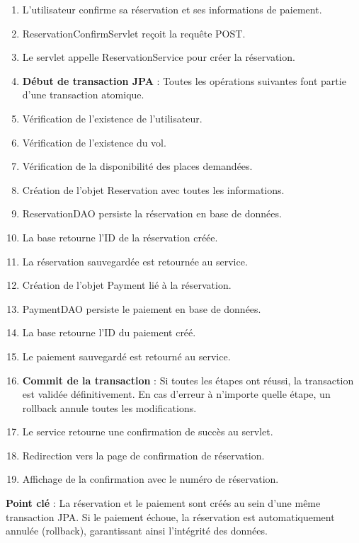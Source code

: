\documentclass[12pt,a4paper]{report}
\begin{document}
\begin{enumerate}
    \item L'utilisateur confirme sa réservation et ses informations de paiement.
    \item ReservationConfirmServlet reçoit la requête POST.
    \item Le servlet appelle ReservationService pour créer la réservation.
    \item \textbf{Début de transaction JPA} : Toutes les opérations suivantes font partie d'une transaction atomique.
    \item Vérification de l'existence de l'utilisateur.
    \item Vérification de l'existence du vol.
    \item Vérification de la disponibilité des places demandées.
    \item Création de l'objet Reservation avec toutes les informations.
    \item ReservationDAO persiste la réservation en base de données.
    \item La base retourne l'ID de la réservation créée.
    \item La réservation sauvegardée est retournée au service.
    \item Création de l'objet Payment lié à la réservation.
    \item PaymentDAO persiste le paiement en base de données.
    \item La base retourne l'ID du paiement créé.
    \item Le paiement sauvegardé est retourné au service.
    \item \textbf{Commit de la transaction} : Si toutes les étapes ont réussi, la transaction est validée définitivement. En cas d'erreur à n'importe quelle étape, un rollback annule toutes les modifications.
    \item Le service retourne une confirmation de succès au servlet.
    \item Redirection vers la page de confirmation de réservation.
    \item Affichage de la confirmation avec le numéro de réservation.
\end{enumerate}

\textbf{Point clé} : La réservation et le paiement sont créés au sein d'une même transaction JPA. Si le paiement échoue, la réservation est automatiquement annulée (rollback), garantissant ainsi l'intégrité des données.
\end{document}
